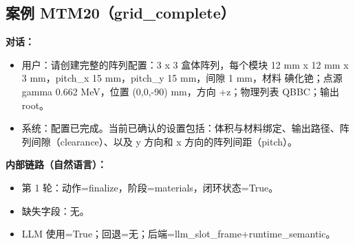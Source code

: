 \documentclass[11pt]{ctexart}
\begin{document}
\subsection{案例 MTM20（grid\_complete）}
\textbf{对话：}
\begin{itemize}
\item 用户：请创建完整的阵列配置：3 x 3 盒体阵列，每个模块 12 mm x 12 mm x 3 mm，pitch\_x 15 mm，pitch\_y 15 mm，间隙 1 mm，材料 碘化铯；点源 gamma 0.662 MeV，位置 (0,0,-90) mm，方向 +z；物理列表 QBBC；输出 root。
\item 系统：配置已完成。当前已确认的设置包括：体积与材料绑定、输出路径、阵列间隙（clearance）、以及 y 方向和 x 方向的阵列间距（pitch）。
\end{itemize}
\textbf{内部链路（自然语言）：}
\begin{itemize}
\item 第 1 轮：动作=finalize，阶段=materials，闭环状态=True。
\item 缺失字段：无。
\item LLM 使用=True；回退=无；后端=llm\_slot\_frame+runtime\_semantic。
\end{itemize}
\end{document}
